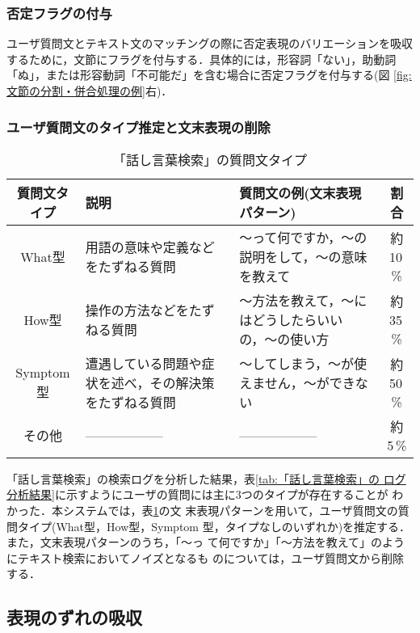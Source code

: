 \subsubsection{否定フラグの付与}

ユーザ質問文とテキスト文のマッチングの際に否定表現のバリエーションを吸収
するために，文節にフラグを付与する．具体的には，形容詞「ない」，助動詞
「ぬ」，または形容動詞「不可能だ」を含む場合に否定フラグを付与する(図
\ref{fig:文節の分割・併合処理の例}右)．


\subsubsection{ユーザ質問文のタイプ推定と文末表現の削除}

\begin{table}
 \caption{「話し言葉検索」の質問文タイプ} \label{tab:「話し言葉検索」のログ分析結果}
 \begin{center}
  \footnotesize
  \begin{tabular}{c|p{4cm}|p{4cm}|c} \hline
   質問文タイプ & 説明 & 質問文の例(文末表現パターン) & 割合 \\ \hline \hline
   What型 & 用語の意味や定義などをたずねる質問 
   & 〜って何ですか，〜の説明をして，〜の意味を教えて
   & 約10\,\% \\ \hline
   How型 & 操作の方法などをたずねる質問 
   & 〜方法を教えて，〜にはどうしたらいいの，〜の使い方
   & 約35\,\% \\ \hline
   Symptom型 & 遭遇している問題や症状を述べ，その解決策をたずねる質問
   & 〜してしまう，〜が使えません，〜ができない
   & 約50\,\% \\ \hline
   その他 & ------------------ & ------------------ & 約5\,\% \\ \hline
  \end{tabular}
 \end{center}
\end{table}


「話し言葉検索」の検索ログを分析した結果，表\ref{tab:「話し言葉検索」の
ログ分析結果}に示すようにユーザの質問には主に3つのタイプが存在することが
わかった．本システムでは，表\ref{tab:「話し言葉検索」のログ分析結果}の文
末表現パターンを用いて，ユーザ質問文の質問タイプ(What型，How型，Symptom 
型，タイプなしのいずれか)を推定する．また，文末表現パターンのうち，「〜っ
て何ですか」「〜方法を教えて」のようにテキスト検索においてノイズとなるも
のについては，ユーザ質問文から削除する．


\subsection{表現のずれの吸収} \label{subsec:同義表現辞書の利用}

